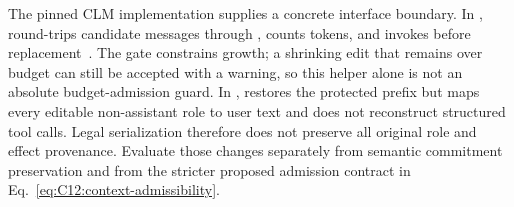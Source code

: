 The pinned CLM implementation supplies a concrete interface boundary. In ,  round-trips candidate messages through , counts tokens, and invokes  before replacement~\cite{repo_clm2026}. The gate constrains growth; a shrinking edit that remains over budget can still be accepted with a warning, so this helper alone is not an absolute budget-admission guard. In ,  restores the protected prefix but maps every editable non-assistant role to user text and does not reconstruct structured tool calls. Legal serialization therefore does not preserve all original role and effect provenance. Evaluate those changes separately from semantic commitment preservation and from the stricter proposed admission contract in Eq.~\eqref{eq:C12:context-admissibility}.
